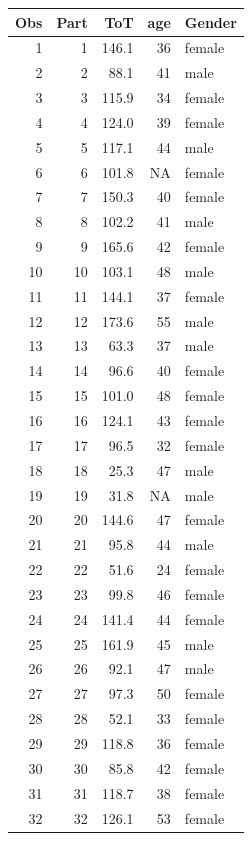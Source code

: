 \documentclass[]{svmono}
\begin{document}
\begin{tabular}{r|r|r|r|l}
\hline
Obs & Part & ToT & age & Gender\\
\hline
1 & 1 & 146.1 & 36 & female\\
\hline
2 & 2 & 88.1 & 41 & male\\
\hline
3 & 3 & 115.9 & 34 & female\\
\hline
4 & 4 & 124.0 & 39 & female\\
\hline
5 & 5 & 117.1 & 44 & male\\
\hline
6 & 6 & 101.8 & NA & female\\
\hline
7 & 7 & 150.3 & 40 & female\\
\hline
8 & 8 & 102.2 & 41 & male\\
\hline
9 & 9 & 165.6 & 42 & female\\
\hline
10 & 10 & 103.1 & 48 & male\\
\hline
11 & 11 & 144.1 & 37 & female\\
\hline
12 & 12 & 173.6 & 55 & male\\
\hline
13 & 13 & 63.3 & 37 & male\\
\hline
14 & 14 & 96.6 & 40 & female\\
\hline
15 & 15 & 101.0 & 48 & female\\
\hline
16 & 16 & 124.1 & 43 & female\\
\hline
17 & 17 & 96.5 & 32 & female\\
\hline
18 & 18 & 25.3 & 47 & male\\
\hline
19 & 19 & 31.8 & NA & male\\
\hline
20 & 20 & 144.6 & 47 & female\\
\hline
21 & 21 & 95.8 & 44 & male\\
\hline
22 & 22 & 51.6 & 24 & female\\
\hline
23 & 23 & 99.8 & 46 & female\\
\hline
24 & 24 & 141.4 & 44 & female\\
\hline
25 & 25 & 161.9 & 45 & male\\
\hline
26 & 26 & 92.1 & 47 & male\\
\hline
27 & 27 & 97.3 & 50 & female\\
\hline
28 & 28 & 52.1 & 33 & female\\
\hline
29 & 29 & 118.8 & 36 & female\\
\hline
30 & 30 & 85.8 & 42 & female\\
\hline
31 & 31 & 118.7 & 38 & female\\
\hline
32 & 32 & 126.1 & 53 & female\\

\end{tabular}
\end{document}
